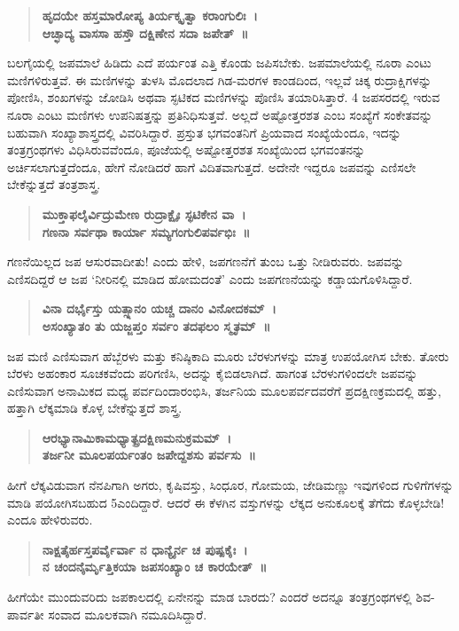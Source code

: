 {\begin{verse}
\textbf{ಹೃದಯೇ ಹಸ್ತಮಾರೋಪ್ಯ ತಿರ್ಯಕ್ಕೃತ್ವಾ ಕರಾಂಗುಲಿಃ~। \\
ಆಚ್ಛಾದ್ಯ ವಾಸಸಾ ಹಸ್ತೌ ದಕ್ಷಿಣೇನ ಸದಾ ಜಪೇತ್~॥}
\end{verse}
ಬಲಗೈಯಲ್ಲಿ ಜಪಮಾಲೆ ಹಿಡಿದು ಎದೆ ಪರ್ಯಂತ ಎತ್ತಿ ಕೊಂಡು ಜಪಿಸಬೇಕು. ಜಪಮಾಲೆಯಲ್ಲಿ ನೂರಾ ಎಂಟು ಮಣಿಗಳಿರುತ್ತವೆ. ಈ ಮಣಿಗಳನ್ನು ತುಳಸಿ ಮೊದಲಾದ ಗಿಡ-ಮರಗಳ ಕಾಂಡದಿಂದ, ಇಲ್ಲವೆ ಚಿಕ್ಕ ರುದ್ರಾಕ್ಷಿಗಳನ್ನು ಪೋಣಿಸಿ, ಶಂಖ\-ಗಳನ್ನು ಜೋಡಿಸಿ ಅಥವಾ ಸ್ಫಟಿಕದ ಮಣಿಗಳನ್ನು ಪೊಣಿಸಿ ತಯಾರಿಸಿತ್ತಾರೆ. 4 ಜಪ\-ಸರದಲ್ಲಿ ಇರುವ ನೂರಾ ಎಂಟು ಮಣಿಗಳು ಉಪನಿಷತ್ತನ್ನು ಪ್ರತಿನಿಧಿಸುತ್ತವೆ. ಅಲ್ಲದೆ ಅಷ್ಟೋತ್ತರ\-ಶತ ಎಂಬ ಸಂಖ್ಯೆಗೆ ಸಂಕೇತವನ್ನು ಬಹುವಾಗಿ ಸಂಖ್ಯಾಶಾಸ್ತ್ರದಲ್ಲಿ ವಿವರಿಸಿ\-ದ್ದಾರೆ. ಪ್ರಸ್ತುತ ಭಗವಂತನಿಗೆ ಪ್ರಿಯವಾದ ಸಂಖ್ಯೆಯೆಂದೂ, ಇದನ್ನು ತಂತ್ರ\-ಗ್ರಂಥಗಳು ವಿಧಿಸಿರುವವೆಂದೂ, ಪೂಜೆಯಲ್ಲಿ ಅಷ್ಟೋತ್ತರಶತ ಸಂಖ್ಯೆಯಿಂದ ಭಗವಂತ\-ನನ್ನು ಅರ್ಚಿಸಲಾಗುತ್ತದೆಂದೂ, ಹೇಗೆ ನೋಡಿದರೆ ಹಾಗೆ ವಿದಿತವಾಗುತ್ತದೆ. ಅದೇನೇ ಇದ್ದರೂ ಜಪವನ್ನು ಎಣಿಸಲೇ ಬೇಕೆನ್ನುತ್ತದೆ ತಂತ್ರಶಾಸ್ತ್ರ.
\begin{verse}
\textbf{ಮುಕ್ತಾಫಲೈರ್ವಿದ್ರುಮೇಣ ರುದ್ರಾಕ್ಷೈಃ ಸ್ಫಟಿಕೇನ ವಾ~। \\
ಗಣನಾ ಸರ್ವಥಾ ಕಾರ್ಯಾ ಸಮ್ಯಗಂಗುಲಿಪರ್ವಭಿಃ~॥}
\end{verse}
ಗಣನೆಯಿಲ್ಲದ ಜಪ ಆಸುರವಾದೀತು! ಎಂದು ಹೇಳಿ, ಜಪಗಣನೆಗೆ ತುಂಬ ಒತ್ತು ನೀಡಿರುವರು. ಜಪವನ್ನು ಎಣಿಸದಿದ್ದರೆ ಆ ಜಪ ‘ನೀರಿನಲ್ಲಿ ಮಾಡಿದ ಹೋಮದಂತೆ’ ಎಂದು ಜಪಗಣನೆಯನ್ನು ಕಡ್ಡಾಯಗೊಳಿಸಿದ್ದಾರೆ.
\begin{verse}
\textbf{ವಿನಾ ದರ್ಭೈಸ್ತು ಯತ್ಸ್ನಾನಂ ಯಚ್ಚ ದಾನಂ ವಿನೋದಕಮ್~। \\
ಅಸಂಖ್ಯಾತಂ ತು ಯಜ್ಜಪ್ತಂ ಸರ್ವಂ ತದಫಲಂ ಸ್ಮೃತಮ್~॥}
\end{verse}
ಜಪ ಮಣಿ ಎಣಿಸುವಾಗ ಹೆಬ್ಬೆರಳು ಮತ್ತು ಕನಿಷ್ಠಿಕಾದಿ ಮೂರು ಬೆರಳುಗಳನ್ನು ಮಾತ್ರ ಉಪಯೋಗಿಸ ಬೇಕು. ತೋರು ಬೆರಳು ಅಹಂಕಾರ ಸೂಚಕವೆಂದು ಪರಿಗಣಿಸಿ, ಅದನ್ನು ಕೈಬಿಡಲಾಗಿದೆ. ಹಾಗಂತ ಬೆರಳುಗಳಿಂದಲೇ ಜಪವನ್ನು ಎಣಿಸುವಾಗ ಅನಾಮಿಕದ ಮಧ್ಯ ಪರ್ವದಿಂದಾರಂಭಿಸಿ, ತರ್ಜನಿಯ ಮೂಲಪರ್ವದವರೆಗೆ ಪ್ರದಕ್ಷಿಣಕ್ರಮದಲ್ಲಿ ಹತ್ತು, ಹತ್ತಾಗಿ ಲೆಕ್ಕಮಾಡಿ ಕೊಳ್ಳ ಬೇಕೆನ್ನುತ್ತದೆ ಶಾಸ್ತ್ರ.
\begin{verse}
\textbf{ಆರಭ್ಯಾನಾಮಿಕಾಮಧ್ಯಾತ್ಪ್ರದಕ್ಷಿಣಮನುಕ್ರಮಮ್~। \\
ತರ್ಜನೀ ಮೂಲಪರ್ಯಂತಂ ಜಪೇದ್ದಶಸು ಪರ್ವಸು~॥}
\end{verse}
ಹೀಗೆ ಲೆಕ್ಕವಿಡುವಾಗ ನೆನಪಿಗಾಗಿ ಅಗರು, ಕೃಷಿವಸ್ತು, ಸಿಂಧೂರ, ಗೋಮಯ, ಜೇಡಿಮಣ್ಣು ಇವುಗಳಿಂದ ಗುಳಿಗೆಗಳನ್ನು ಮಾಡಿ ಪಯೋಗಿಸಬಹುದ 5ಎಂದಿದ್ದಾರೆ. ಆದರೆ ಈ ಕೆಳಗಿನ ವಸ್ತುಗಳನ್ನು ಲೆಕ್ಕದ ಅನುಕೂಲಕ್ಕೆ ತೆಗೆದು ಕೊಳ್ಳಬೇಡಿ! ಎಂದೂ ಹೇಳಿ\-ರುವರು.
\begin{verse}
\textbf{ನಾಕ್ಷತೈರ್ಹಸ್ತಪರ್ವೈರ್ವಾ ನ ಧಾನ್ಯೈರ್ನ ಚ ಪುಷ್ಪಕೈಃ~। \\
ನ ಚಂದನೈರ್ಮೃತ್ತಿಕಯಾ ಜಪಸಂಖ್ಯಾಂ ಚ ಕಾರಯೇತ್~॥}
\end{verse}
ಹೀಗೆಯೇ ಮುಂದುವರಿದು ಜಪಕಾಲದಲ್ಲಿ ಏನೇನನ್ನು ಮಾಡ ಬಾರದು? ಎಂದರೆ ಅದನ್ನೂ ತಂತ್ರಗ್ರಂಥಗಳಲ್ಲಿ ಶಿವ-ಪಾರ್ವತೀ ಸಂವಾದ ಮೂಲಕವಾಗಿ ನಮೂದಿಸಿದ್ದಾರೆ.
}
